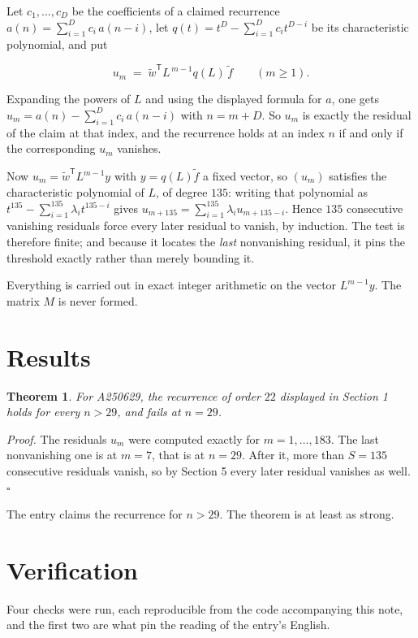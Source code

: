 \documentclass[11pt]{article}
\newtheorem{theorem}{Theorem}
\theoremstyle{definition}
\begin{document}
Let $c_1,\dots,c_D$ be the coefficients of a claimed recurrence $a(n) = \sum_{i=1}^{D} c_i\,a(n-i)$, let $q(t) = t^{D} - \sum_{i=1}^{D} c_i t^{D-i}$ be its characteristic polynomial, and put

\[u_m \;=\; \tilde w^{\mathsf T} L^{\,m-1} q(L)\,\tilde f \qquad (m \ge 1).\]

Expanding the powers of $L$ and using the displayed formula for $a$, one gets $u_m = a(n) - \sum_{i=1}^{D} c_i\,a(n-i)$ with $n = m + D$. So $u_m$ is exactly the residual of the claim at that index, and the recurrence holds at an index $n$ if and only if the corresponding $u_m$ vanishes.

Now $u_m = \tilde w^{\mathsf T} L^{m-1} y$ with $y = q(L)\tilde f$ a fixed vector, so $(u_m)$ satisfies the characteristic polynomial of $L$, of degree $135$: writing that polynomial as $t^{135} - \sum_{i=1}^{135} \lambda_i t^{135-i}$ gives $u_{m+135} = \sum_{i=1}^{135} \lambda_i u_{m+135-i}$. Hence $135$ consecutive vanishing residuals force every later residual to vanish, by induction. The test is therefore finite; and because it locates the {\itshape last} nonvanishing residual, it pins the threshold exactly rather than merely bounding it.

Everything is carried out in exact integer arithmetic on the vector $L^{m-1}y$. The matrix $M$ is never formed.

\section{Results}

\begin{theorem} For A250629, the recurrence of order $22$ displayed in Section 1 holds for every $n > 29$, and fails at $n = 29$.\end{theorem}

{\itshape Proof.} The residuals $u_m$ were computed exactly for $m = 1,\dots,183$. The last nonvanishing one is at $m = 7$, that is at $n = 29$. After it, more than $S = 135$ consecutive residuals vanish, so by Section 5 every later residual vanishes as well. $\square$

The entry claims the recurrence for $n > 29$. The theorem is at least as strong.

\section{Verification}

Four checks were run, each reproducible from the code accompanying this note, and the first two are what pin the reading of the entry's English.
\end{document}
